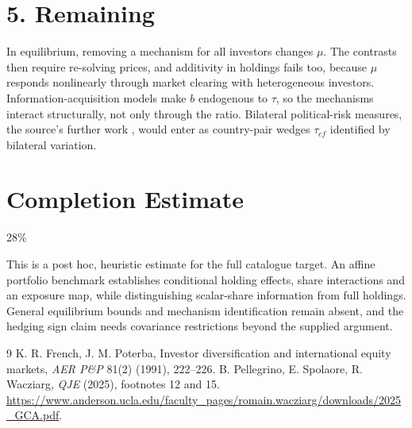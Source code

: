 \documentclass[11pt]{article}
\theoremstyle{definition}
\begin{document}
\section*{5. Remaining}
In equilibrium, removing a mechanism for all investors changes $\mu$. The contrasts then require re-solving prices, and
additivity in holdings fails too, because $\mu$ responds nonlinearly through market clearing with heterogeneous investors.
Information-acquisition models make $b$ endogenous to $\tau$, so the mechanisms interact structurally, not only through the
ratio. Bilateral political-risk measures, the source's further work \cite{psw}, would enter as country-pair wedges $\tau_{cf}$
identified by bilateral variation.

\section{Completion Estimate}
28\%

This is a post hoc, heuristic estimate for the full catalogue target.
An affine portfolio benchmark establishes conditional holding effects, share interactions and an exposure map, while distinguishing scalar-share information from full holdings. General equilibrium bounds and mechanism identification remain absent, and the hedging sign claim needs covariance restrictions beyond the supplied argument.

\begin{thebibliography}{9}
 K. R. French, J. M. Poterba, Investor diversification and international equity markets, \emph{AER P\&P} 81(2) (1991), 222--226.
 B. Pellegrino, E. Spolaore, R. Wacziarg, \emph{QJE} (2025), footnotes 12 and 15. \url{https://www.anderson.ucla.edu/faculty_pages/romain.wacziarg/downloads/2025_GCA.pdf}.
\end{thebibliography}
\end{document}
